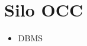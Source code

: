 \documentclass[11pt]{article}
\begin{document}
\section{Silo OCC}
\begin{itemize}
    \item {} DBMS ~\cite{tu-sosp2013}
\end{itemize}

\newpage


\end{document}
